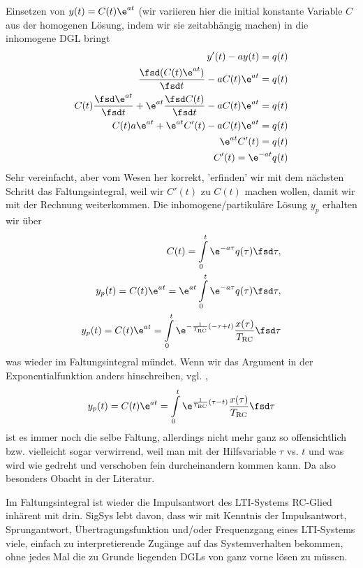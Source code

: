 Einsetzen von $y(t) = C(t) \e^{a t}$ (wir variieren hier die initial konstante Variable $C$ aus der homogenen Lösung, indem wir sie zeitabhängig machen) in die inhomogene DGL bringt
\begin{align}
y'(t) - a y(t) = q(t)\\
\frac{\fsd (C(t) \e^{a t})}{\fsd t} - a C(t) \e^{a t} = q(t)\\
C(t) \frac{\fsd \e^{a t}}{\fsd t} + \e^{a t} \frac{\fsd C(t)}{\fsd t} - a C(t) \e^{a t} = q(t)\\
C(t) a \e^{a t} + \e^{a t} C'(t) - a C(t) \e^{a t} = q(t)\\
\e^{a t} C'(t) = q(t)\\
C'(t) = \e^{-a t} q(t)
\end{align}
Sehr vereinfacht, aber vom Wesen her korrekt, 'erfinden' wir mit dem nächsten Schritt das Faltungsintegral, weil wir $C'(t)$ zu $C(t)$ machen wollen, damit wir mit der Rechnung weiterkommen.
Die inhomogene/partikuläre Lösung $y_p$ erhalten wir über
\begin{align}
C(t) = \int\limits_{0}^{t} \e^{-a \tau} q(\tau) \fsd\tau,\\
y_p(t) = C(t) \e^{a t} = \e^{a t}\int\limits_{0}^{t} \e^{-a \tau} q(\tau) \fsd\tau,\\
y_p(t) = C(t) \e^{a t} = \int\limits_{0}^{t} \e^{-\frac{1}{\TRC} (-\tau+t)} \frac{x(\tau)}{\TRC} \fsd\tau
\end{align}
was wieder im Faltungsintegral mündet.
Wenn wir das Argument in der Exponentialfunktion anders hinschreiben, vgl. \cite[Anhang A.2]{Paull2017},
\begin{align}
y_p(t) = C(t) \e^{a t} = \int\limits_{0}^{t} \e^{\frac{1}{\TRC} (\tau-t)} \frac{x(\tau)}{\TRC} \fsd\tau
\end{align}
ist es immer noch die selbe Faltung, allerdings nicht mehr ganz so offensichtlich bzw. vielleicht sogar verwirrend, weil man mit der Hilfsvariable $\tau$ vs. $t$ und was wird wie gedreht und verschoben fein durcheinandern kommen kann. Da also besonders Obacht in der Literatur.
%

Im Faltungsintegral ist wieder die Impulsantwort des LTI-Systems RC-Glied inhärent mit drin.
%
SigSys lebt davon, dass wir mit Kenntnis der Impulsantwort, Sprungantwort, Übertragungsfunktion und/oder Frequenzgang eines LTI-Systems viele, einfach zu interpretierende Zugänge auf das Systemverhalten bekommen, ohne jedes Mal die zu Grunde liegenden DGLs von ganz vorne lösen zu müssen.
